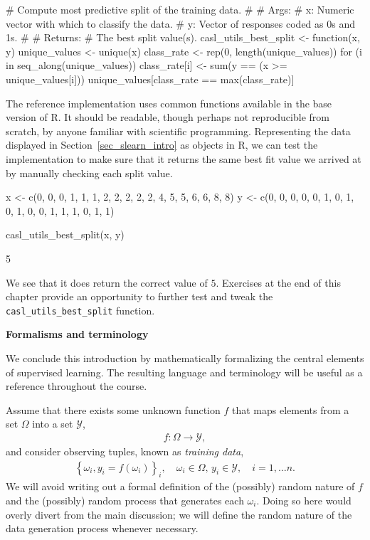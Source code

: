 \documentclass[12pt,hidelinks]{article}
\newcommand{\code}[1]{\texttt{#1}}
\numberwithin{equation}{section}
\begin{document}
\begin{rcode}
# Compute most predictive split of the training data.
#
# Args:
#     x: Numeric vector with which to classify the data.
#     y: Vector of responses coded as 0s and 1s.
#
# Returns:
#     The best split value(s).
casl_utils_best_split <-
function(x, y)
{
  unique_values <- unique(x)
  class_rate <- rep(0, length(unique_values))
  for (i in seq_along(unique_values))
  {
    class_rate[i] <- sum(y == (x >= unique_values[i]))
  }
  unique_values[class_rate == max(class_rate)]
}
\end{rcode}

The reference implementation uses common functions available in the base
version of R. It should be readable, though perhaps not reproducible from
scratch, by anyone familiar with scientific programming. Representing the data
displayed in Section~\ref{sec_slearn_intro} as objects in R, we can test the
implementation to make sure that it returns the same best fit value we arrived
at by manually checking each split value.

\begin{rcode}
x <- c(0, 0, 0, 1, 1, 1, 2, 2, 2, 2, 2, 4, 5, 5, 6, 6, 8, 8)
y <- c(0, 0, 0, 0, 0, 1, 0, 1, 0, 1, 0, 0, 1, 1, 1, 0, 1, 1)

casl_utils_best_split(x, y)
\end{rcode}
\begin{rres}
[1] 5
\end{rres}

We see that it does return the correct value of $5$. Exercises at the
end of this chapter provide an opportunity to further test and tweak the
\code{casl\_utils\_best\_split} function.

\vspace{12pt}
\textbf{Formalisms and terminology}

We conclude this introduction by mathematically formalizing the central
elements of supervised learning. The resulting language and terminology will
be useful as a reference throughout the course.

Assume that there exists some unknown function $f$ that maps
elements from a set $\Omega$ into a set $\mathcal{Y}$,
\begin{align}
f: \Omega \rightarrow \mathcal{Y}, \label{abstract_slearn}
\end{align}
and consider observing tuples, known as \textit{training data},
\begin{align}
\left\{ \omega_i, y_i = f(\omega_i) \right\}_{i},
\quad \omega_i \in \Omega, \, y_i \in \mathcal{Y},
\quad i = 1, \ldots n.
\end{align}
We will avoid writing out a formal definition of the (possibly) random nature
of $f$ and the (possibly) random process that generates each $\omega_i$.
Doing so here would overly divert from the main discussion; we will define the
random nature of the data generation process whenever necessary.
\end{document}

